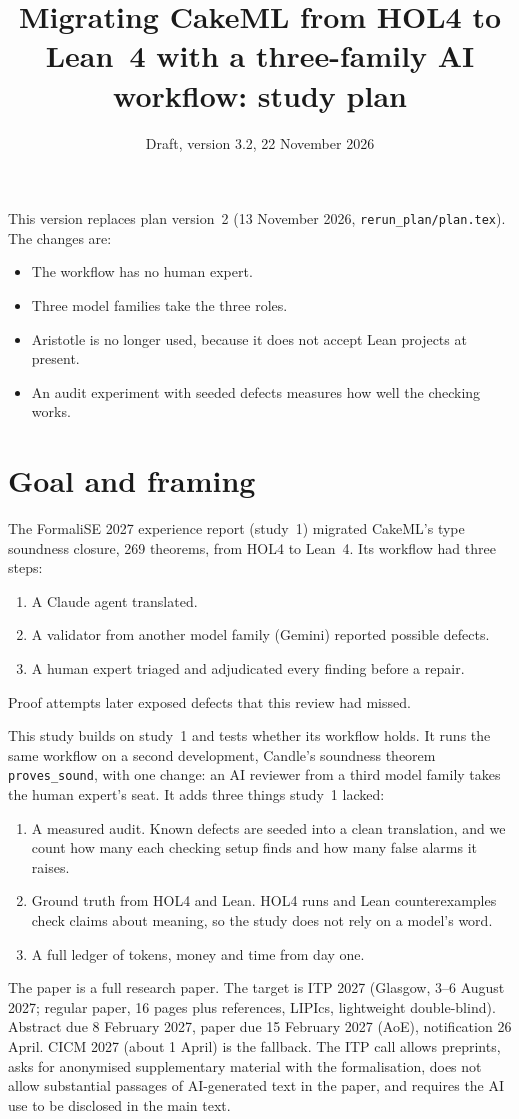 \documentclass[11pt,a4paper]{article}
\title{Migrating CakeML from HOL4 to Lean~4 with a three-family AI workflow: study plan}
\author{Draft, version 3.2, 22 November 2026}
\date{}
\newcommand{\code}[1]{\texttt{#1}}
\begin{document}
\sloppy
\maketitle

\noindent This version replaces plan version~2 (13 November 2026, \code{rerun\_plan/plan.tex}). The changes are:
\begin{itemize}
\item The workflow has no human expert.
\item Three model families take the three roles.
\item Aristotle is no longer used, because it does not accept Lean projects at present.
\item An audit experiment with seeded defects measures how well the checking works.
\end{itemize}

\section{Goal and framing}
The FormaliSE 2027 experience report (study~1) migrated CakeML's type soundness closure, 269 theorems, from HOL4 to Lean~4. Its workflow had three steps:
\begin{enumerate}
\item A Claude agent translated.
\item A validator from another model family (Gemini) reported possible defects.
\item A human expert triaged and adjudicated every finding before a repair.
\end{enumerate}
Proof attempts later exposed defects that this review had missed.

This study builds on study~1 and tests whether its workflow holds. It runs the same workflow on a second development, Candle's soundness theorem \code{proves\_sound}, with one change: an AI reviewer from a third model family takes the human expert's seat. It adds three things study~1 lacked:
\begin{enumerate}
\item A measured audit. Known defects are seeded into a clean translation, and we count how many each checking setup finds and how many false alarms it raises.
\item Ground truth from HOL4 and Lean. HOL4 runs and Lean counterexamples check claims about meaning, so the study does not rely on a model's word.
\item A full ledger of tokens, money and time from day one.
\end{enumerate}
The paper is a full research paper. The target is ITP 2027 (Glasgow, 3--6 August 2027; regular paper, 16 pages plus references, LIPIcs, lightweight double-blind). Abstract due 8 February 2027, paper due 15 February 2027 (AoE), notification 26 April. CICM 2027 (about 1 April) is the fallback. The ITP call allows preprints, asks for anonymised supplementary material with the formalisation, does not allow substantial passages of AI-generated text in the paper, and requires the AI use to be disclosed in the main text.
\end{document}
